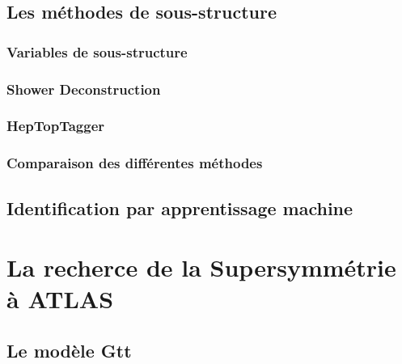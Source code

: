 \documentclass[12pt,canadien]{report}
\begin{document}
\section{Les méthodes de sous-structure}
\label{sec:top:sous_structure}

\subsection{Variables de sous-structure}
\label{sec:top:sous_structure:variables}

\subsection{Shower Deconstruction}
\label{sec:top:sous_structure:shower}

\subsection{HepTopTagger}
\label{sec:top:sous_structure:hep}

\subsection{Comparaison des différentes méthodes}
\label{sec:top:sous_structure:comp}


\section{Identification par apprentissage machine}
\label{sec:top:ml}

\singlespacing{}
\chapter{La recherce de la Supersymmétrie à ATLAS}
\label{susy_atlas}
\doublespacing{}

\section{Le modèle Gtt}
\label{sec:susy_atlas:gtt}
\end{document}
